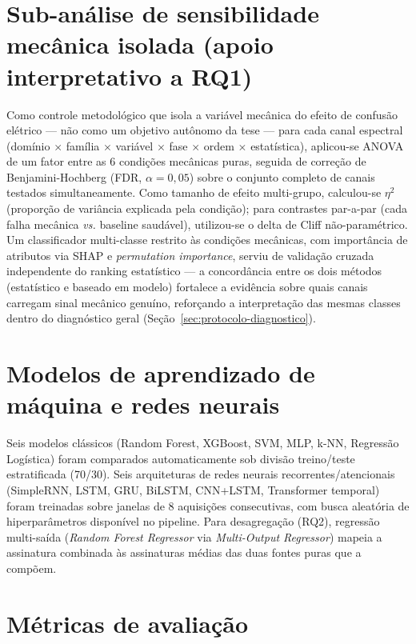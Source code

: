 \documentclass[12pt,a4paper]{report}
\begin{document}
\section{Sub-análise de sensibilidade mecânica isolada (apoio interpretativo a RQ1)}
\label{sec:protocolo-estatistico}

Como controle metodológico que isola a variável mecânica do efeito de
confusão elétrico — não como um objetivo autônomo da tese — para cada canal
espectral (domínio $\times$ família $\times$ variável $\times$ fase $\times$
ordem $\times$ estatística), aplicou-se ANOVA de um fator entre as 6
condições mecânicas puras, seguida de correção de Benjamini-Hochberg (FDR,
$\alpha=0{,}05$) sobre o conjunto completo de canais testados
simultaneamente. Como tamanho de efeito multi-grupo, calculou-se $\eta^2$
(proporção de variância explicada pela condição); para contrastes par-a-par
(cada falha mecânica \emph{vs.} baseline saudável), utilizou-se o delta de
Cliff não-paramétrico. Um classificador multi-classe restrito às condições
mecânicas, com importância de atributos via SHAP e \emph{permutation
importance}, serviu de validação cruzada independente do ranking estatístico
— a concordância entre os dois métodos (estatístico e baseado em modelo)
fortalece a evidência sobre quais canais carregam sinal mecânico genuíno,
reforçando a interpretação das mesmas classes dentro do diagnóstico geral
(Seção~\ref{sec:protocolo-diagnostico}).

\section{Modelos de aprendizado de máquina e redes neurais}

Seis modelos clássicos (Random Forest, XGBoost, SVM, MLP, k-NN, Regressão
Logística) foram comparados automaticamente sob divisão treino/teste
estratificada (70/30). Seis arquiteturas de redes neurais
recorrentes/atencionais (SimpleRNN, LSTM, GRU, BiLSTM, CNN+LSTM, Transformer
temporal) foram treinadas sobre janelas de 8 aquisições consecutivas, com
busca aleatória de hiperparâmetros disponível no pipeline. Para desagregação
(RQ2), regressão multi-saída (\emph{Random Forest Regressor} via
\emph{Multi-Output Regressor}) mapeia a assinatura combinada às assinaturas
médias das duas fontes puras que a compõem.

\section{Métricas de avaliação}
\end{document}
